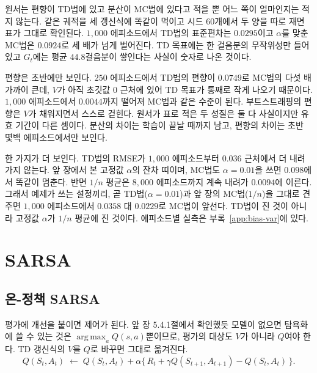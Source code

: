\documentclass[11pt,a4paper]{article}
\DeclareMathOperator*{\argmax}{arg\,max}
\begin{document}
원서는 편향이 TD법에 있고 분산이 MC법에 있다고 적을 뿐 어느 쪽이 얼마인지는 적지 않는다. 같은
궤적을 세 갱신식에 똑같이 먹이고 시드 $60$개에서 두 양을 따로 재면 표가 그대로 확인된다.
$1{,}000$ 에피소드에서 TD법의 표준편차는 $0.0295$이고 $\alpha$를 맞춘 MC법은 $0.0924$로 세 배가
넘게 벌어진다. TD 목표에는 한 걸음분의 무작위성만 들어 있고 $G_t$에는 평균 $44.8$걸음분이 쌓인다는
사실이 숫자로 나온 것이다.

편향은 초반에만 보인다. $250$ 에피소드에서 TD법의 편향이 $0.0749$로 MC법의 다섯 배 가까이 큰데,
$V$가 아직 초깃값 $0$ 근처에 있어 TD 목표가 통째로 작게 나오기 때문이다. $1{,}000$ 에피소드에서
$0.0044$까지 떨어져 MC법과 같은 수준이 된다. 부트스트래핑의 편향은 $V$가 채워지면서 스스로 걷힌다.
원서가 표로 적은 두 성질은 둘 다 사실이지만 유효 기간이 다른 셈이다. 분산의 차이는 학습이 끝날
때까지 남고, 편향의 차이는 초반 몇백 에피소드에서만 보인다.

한 가지가 더 보인다. TD법의 RMSE가 $1{,}000$ 에피소드부터 $0.036$ 근처에서 더 내려가지 않는다. 앞
장에서 본 고정값 $\alpha$의 잔차 띠이며, MC법도 $\alpha=0.01$을 쓰면 $0.098$에서 똑같이 멈춘다.
반면 $1/n$ 평균은 $8{,}000$ 에피소드까지 계속 내려가 $0.0094$에 이른다. 그래서 예제가 쓰는
설정끼리, 곧 TD법($\alpha=0.01$)과 앞 장의 MC법($1/n$)을 그대로 견주면 $1{,}000$ 에피소드에서
$0.0358$ 대 $0.0229$로 MC법이 앞선다. TD법이 진 것이 아니라 고정값 $\alpha$가 $1/n$ 평균에 진
것이다. 에피소드별 실측은 부록~\ref{app:bias-var}에 있다.

\section{SARSA}
\label{sec:sarsa}

\subsection{온-정책 SARSA}
\label{sec:sarsa-derive}

평가에 개선을 붙이면 제어가 된다. 앞 장 5.4.1절에서 확인했듯 모델이 없으면 탐욕화에 쓸 수 있는
것은 $\argmax_a Q(s,a)$뿐이므로, 평가의 대상도 $V$가 아니라 $Q$여야 한다. TD 갱신식의 $V$를 $Q$로
바꾸면 그대로 옮겨진다.
\begin{equation*}
  Q(S_t,A_t) \;\leftarrow\; Q(S_t,A_t)
    + \alpha\bigl\{\, R_t + \gamma Q(S_{t+1},A_{t+1}) - Q(S_t,A_t) \,\bigr\}.
\end{equation*}
\end{document}
